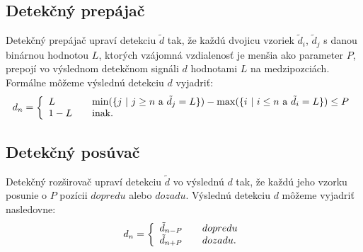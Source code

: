 \subsection{Detekčný prepájač}
Detekčný prepájač upraví detekciu $\tilde{d}$ tak, že každú dvojicu vzoriek $\tilde{d}_i$, $\tilde{d}_j$ s danou binárnou hodnotou $L$, ktorých vzájomná vzdialenosť je menšia ako parameter $P$, prepojí vo výslednom detekčnom signáli $d$ hodnotami $L$ na medzipozciách. Formálne môžeme výslednú detekciu $d$ vyjadriť:
$$d_n = \left\{\begin{array}{l l}
	L & \quad \min(\{\text{$j$ | $j \geq n$ a $\tilde{d}_j=L$} \}) - \max(\{\text{$i$ | $i \leq n$ a $\tilde{d}_i=L$} \}) \leq P\\
	1-L & \quad \text{inak}.\\
\end{array} \right.$$

\subsection{Detekčný posúvač}
Detekčný rozširovač upraví detekciu $\tilde{d}$ vo výslednú $d$ tak, že každú jeho vzorku posunie o $P$ pozícii $dopredu$ alebo $dozadu$. Výslednú detekciu $d$ môžeme vyjadriť nasledovne:
$$d_n = \left\{\begin{array}{l l}
	\tilde{d}_{n-P} & \quad dopredu\\
	\tilde{d}_{n+P} & \quad dozadu.\\
\end{array} \right.$$
